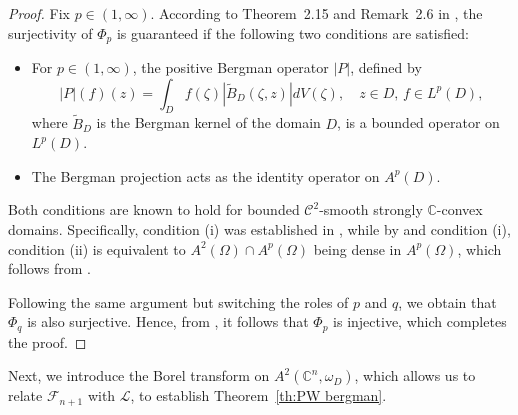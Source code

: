 \documentclass[11pt, oneside, reqno]{amsart}
\numberwithin{equation}{section}
\theoremstyle{definition}
\newcommand{\cont}{\mathcal C}
\newcommand{\C}{\mathbb C}
\newcommand{\F}{\mathcal F}
\begin{document}
{\begin{proof}
{Fix $p\in(1,\infty)$.
According to Theorem~2.15 and Remark~2.6 in \cite{CEM19},  the surjectivity of $\Phi_p$ is guaranteed if the following two conditions are satisfied:
\begin{itemize}
    \item [(i)]For $p \in(1, \infty)$, the positive Bergman operator $|P|$, defined by
    \[
    |P|(f)(z)=\int_D f(\zeta) | \widetilde{B}_D(\zeta,z)| dV(\zeta),\quad z\in D, \,f\in L^p(D),
    \]
    where $\widetilde{B}_D$ is the Bergman kernel of the domain $D$, is a bounded operator on $L^p(D)$.
     \item[(ii)] The Bergman projection acts as the identity operator on $A^p(D)$.
\end{itemize}
  Both conditions are known to hold for bounded $\cont^2$-smooth strongly $\mathbb{C}$-convex domains. Specifically, condition (i) was established in \cite{LS12}, while by \cite[Lemma 2.8]{CEM19} and condition (i), condition (ii) is equivalent to $A^2(\Omega)\cap A^p(\Omega)$ being dense in $A^p(\Omega)$, which follows from \cite[Proposition 7.1]{LS12}.}
  Following the same argument but switching the roles of $p$ and $q$, we obtain that $\Phi_q$ is also surjective. Hence, from {\cite[Corollary 2.14]{CEM19}}, it follows that $\Phi_p$ is injective, which completes the proof.
\end{proof} 

Next, we introduce the Borel transform on $A^2(\C^n,\omega_D)$, which allows us to relate $\F_{n+1}$ with $\mathcal L$, to establish Theorem~\ref{th:PW bergman}.

}
\end{document}
